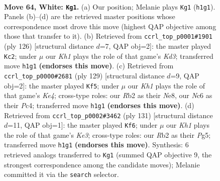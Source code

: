 \documentclass[11pt]{article}
\begin{document}
\clearpage

\begin{figure}[p]\centering
\begin{subfigure}{0.46\textwidth}\centering
\resizebox{\linewidth}{!}{%
\newchessgame
\chessboard[
  setfen={8/8/2Np4/5k2/7p/6p1/1R6/4n2K w - - 2 64},
  showmover=false,
  pgfstyle=straightmove, color=movearrow, markmove={h1-g1}
]}
\caption{}
\end{subfigure}\hfill
\begin{subfigure}{0.46\textwidth}\centering
\resizebox{\linewidth}{!}{%
\newchessgame
\chessboard[
  setfen={8/8/2n5/2P5/7k/p2K4/1p6/6R1 w - - 0 64},
  showmover=false,
  pgfstyle=straightmove, color=movearrow, markmove={d3-c2}
]}
\caption{}
\end{subfigure}
\\[4pt]
\begin{subfigure}{0.46\textwidth}\centering
\resizebox{\linewidth}{!}{%
\newchessgame
\chessboard[
  setfen={4n3/8/8/4k1P1/2p4P/2N2K2/8/8 b - - 0 65},
  showmover=false,
  pgfstyle=straightmove, color=movearrow, markmove={e5-f5}
]}
\caption{}
\end{subfigure}\hfill
\begin{subfigure}{0.46\textwidth}\centering
\resizebox{\linewidth}{!}{%
\newchessgame
\chessboard[
  setfen={8/8/4k3/6p1/6P1/2n1K2P/8/4N3 b - - 8 66},
  showmover=false,
  pgfstyle=straightmove, color=movearrow, markmove={e6-f6}
]}
\caption{}
\end{subfigure}
\caption{\textbf{Move 64, White: \texttt{Kg1}.} (a) Our position; Melanie plays \texttt{Kg1} (\texttt{h1g1}). Panels (b)--(d) are the retrieved master positions whose correspondence most drove this move (highest QAP objective among those that transfer to it). (b) Retrieved from \texttt{ccrl\_top\_p0001\#1901} (ply 126) [structural distance $d$=7, QAP obj=2]: the master played \texttt{Kc2}; under $\mu$ our \emph{Kh1} plays the role of that game's \emph{Kd3}; transferred move \texttt{h1g1} \textbf{(endorses this move)}. (c) Retrieved from \texttt{ccrl\_top\_p0000\#2681} (ply 129) [structural distance $d$=9, QAP obj=2]: the master played \texttt{Kf5}; under $\mu$ our \emph{Kh1} plays the role of that game's \emph{Ke4}; cross-type roles: our \emph{R}b2 as their \emph{N}e8, our \emph{N}c6 as their \emph{P}c4; transferred move \texttt{h1g1} \textbf{(endorses this move)}. (d) Retrieved from \texttt{ccrl\_top\_p0002\#3462} (ply 131) [structural distance $d$=11, QAP obj=1]: the master played \texttt{Kf6}; under $\mu$ our \emph{Kh1} plays the role of that game's \emph{Ke3}; cross-type roles: our \emph{R}b2 as their \emph{P}g5; transferred move \texttt{h1g1} \textbf{(endorses this move)}. Synthesis: 6 retrieved analogs transferred to \texttt{Kg1} (summed QAP objective 9, the strongest correspondence among the candidate moves); Melanie committed it via the \texttt{search} selector.}
\label{fig:thought-m126}
\end{figure}
\end{document}
